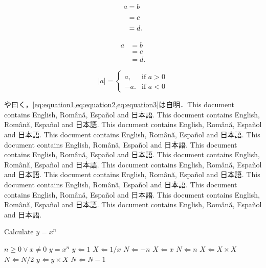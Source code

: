 \documentclass[
  10pt,      %
  a4j,       %
  twocolumn, %
  english,   %
  uplatex,
  dvipdfmx
]{jsarticle}
\begin{document}
\begin{align}
\label{eq:equation1}
a &= b	\\
&= c	\notag\\
\label{eq:equation2}
&= d.
\end{align}

\begin{equation}
\label{eq:equation3}
\begin{aligned}
a &= b	\\
&= c	\\
&= d.
\end{aligned}
\end{equation}

\begin{equation}
\label{eq:equation4}
|a| =
\begin{cases}
a,  & \text{if $a>0$}\\
-a. & \text{if $a<0$}
\end{cases}
\end{equation}

\citet{110001167075}や\citet{mr1763essay}曰く，\ref{eq:equation1,eq:equation2,eq:equation3}は自明．This document contains English, Română, Español and 日本語. This document contains English, Română, Español and 日本語. This document contains English, Română, Español and 日本語. This document contains English, Română, Español and 日本語. This document contains English, Română, Español and 日本語. This document contains English, Română, Español and 日本語. This document contains English, Română, Español and 日本語. This document contains English, Română, Español and 日本語. This document contains English, Română, Español and 日本語. This document contains English, Română, Español and 日本語. This document contains English, Română, Español and 日本語. This document contains English, Română, Español and 日本語. This document contains English, Română, Español and 日本語.

\begin{algorithm}[t]
    \caption{Calculate $y = x^n$}
    \label{alg:algorithm}
    \begin{algorithmic}[1]
        \Require	$n \geq 0 \vee x \neq 0$
        \Ensure	$y = x^n$
        \State $y \Leftarrow 1$
                \State $X \Leftarrow 1 / x$
                \State $N \Leftarrow -n$
            \Else
                \State $X \Leftarrow x$
                \State $N \Leftarrow n$
            \EndIf
                \State $X \Leftarrow X \times X$
                \State $N \Leftarrow N / 2$
            \Else[$N$ is odd]
                \State $y \Leftarrow y \times X$
                \State $N \Leftarrow N - 1$
            \EndIf
        \EndWhile
    \end{algorithmic}
\end{algorithm}

{\footnotesize
    
    

    \makeatletter
    \renewcommand{\@biblabel}[1]{#1)} %
    \makeatother

}
\end{document}
